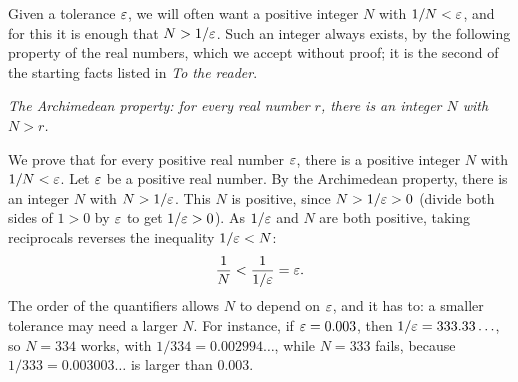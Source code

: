 Given a tolerance $\varepsilon$, we will often want a positive integer $N$ with $1/N<\varepsilon$, and for this it is enough that $N>1/\varepsilon$. Such an integer always exists, by the following property of the real numbers, which we accept without proof; it is the second of the starting facts listed in \emph{To the reader}.
\begin{center}
\emph{The Archimedean property: for every real number $r$, there is an integer $N$ with $N>r$.}
\end{center}

\begin{example}\label{ch02:ex:archimedes}
We prove that for every positive real number $\varepsilon$, there is a positive integer $N$ with $1/N<\varepsilon$. Let $\varepsilon$ be a positive real number. By the Archimedean property, there is an integer $N$ with $N>1/\varepsilon$. This $N$ is positive, since $N>1/\varepsilon>0$ (divide both sides of $1>0$ by $\varepsilon$ to get $1/\varepsilon>0$). As $1/\varepsilon$ and $N$ are both positive, taking reciprocals reverses the inequality $1/\varepsilon<N$:
\[
\frac1N<\frac{1}{1/\varepsilon}=\varepsilon.
\]
The order of the quantifiers allows $N$ to depend on $\varepsilon$, and it has to: a smaller tolerance may need a larger $N$. For instance, if $\varepsilon=0.003$, then $1/\varepsilon=333.33\ldots$, so $N=334$ works, with $1/334=0.002994\ldots$, while $N=333$ fails, because $1/333=0.003003\ldots$ is larger than $0.003$.
\end{example}

